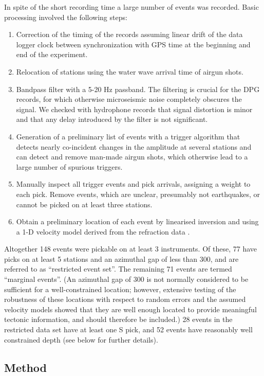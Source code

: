 \documentclass[jgr]{agu2001}
\newlength{\tw}
\begin{document}
\begin{article}
 In spite of the short recording time a large number of events was
recorded. Basic processing involved the following steps:
\begin{enumerate}
\item 
Correction of the timing of the records assuming  linear drift
of the data logger clock between synchronization with GPS time at the
beginning and end of the experiment.  
\item Relocation of stations using the water wave arrival time of
airgun shots.
\item Bandpass filter with a 5-20 Hz passband.  The
filtering is crucial for the DPG records, for which otherwise
microseismic noise completely obscures the signal. We checked with
hydrophone records that signal distortion is minor and that any delay introduced by
the filter is not significant.  
\item Generation of  a preliminary list of events
with a trigger algorithm that  detects nearly
co-incident changes in the amplitude at several stations and can
detect and remove man-made airgun shots, which otherwise lead to a
large number of spurious triggers.  
\item Manually inspect all trigger events and pick arrivals, assigning
a weight to each pick. Remove
events, which are unclear, presumably not earthquakes, or cannot be
picked on at least three stations. 
\item Obtain a preliminary location of each event by linearised
inversion and using a 1-D velocity model derived from the refraction
data \citep{planert-con03}.
\end{enumerate}
Altogether 148 events were pickable on at least 3 instruments. Of
these, 77 have picks on at least 5 stations and an azimuthal gap of
less than 300\dg, and are referred to as ``restricted event set''. The
remaining 71 events are termed ``marginal events''. (An azimuthal gap
of 300{\dg} is not normally considered to be sufficient for a
well-constrained location; however, extensive testing of the
robustness of these locations with respect to random errors and the
assumed velocity models showed that they are well enough located to
provide meaningful tectonic information, and should therefore be included.)
28 events in the
restricted data set
 have at least one S pick, and 52 events have reasonably well
constrained depth (see below for further details). 

\subsection{Method}


\end{article}
\end{document}
